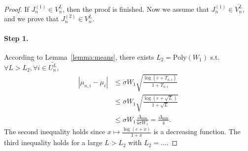 \begin{proof}
    If $J_n^{(1)} \in V_n^L$, then the proof is finished. Now we assume that $J_n^{(1)} \in \bar{V_n^L}$, and we prove that $J_n^{(2)} \in V_n^L$.
    \paragraph{Step 1.} According to Lemma~\ref{lemma:means}, there exists $L_2 = \text{Poly}(W_1)$ s.t. $\forall L > L_2, \forall i \in \bar{U_n^L}$,
    \begin{align*}
        |\mu_{n,i} - \mu_{i}| &\leq \sigma W_1 \sqrt{\frac{\log(e+T_{n,i})}{1+T_{n,i}}}\\
                              &\leq \sigma W_1 \sqrt{\frac{\log(e+\sqrt{L})}{1+\sqrt{L}}}\\
                              &\leq \sigma W_1 \frac{\Delta_{\text{min}}}{4\sigma W_1} = \frac{\Delta_{\text{min}}}{4}.
    \end{align*}
    The second inequality holds since $x\mapsto \frac{\log(e+x)}{1+x}$ is a decreasing function. The third inequality holds for a large $L>L_2$ with $L_2 = \ldots$.
    

\end{proof}
